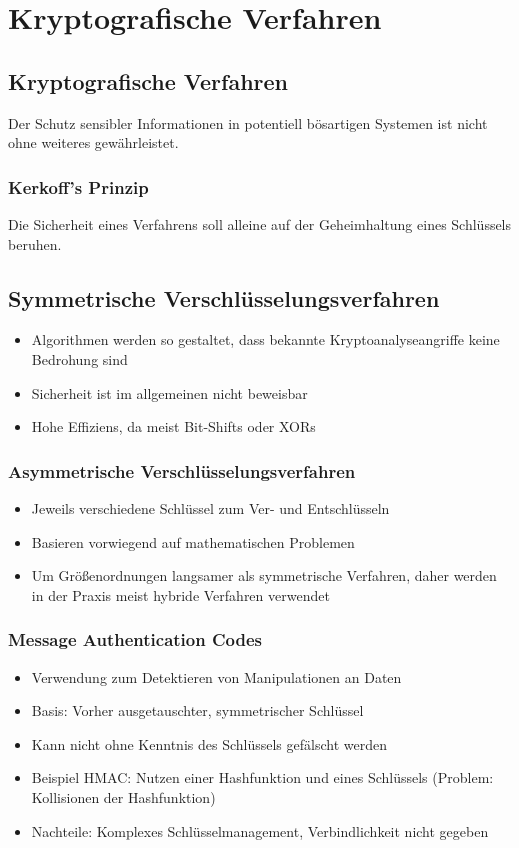 \section{Kryptografische Verfahren}

\subsection{Kryptografische Verfahren}
Der Schutz sensibler Informationen in potentiell bösartigen Systemen ist nicht ohne weiteres gewährleistet.

\subsubsection{Kerkoff's Prinzip}
Die Sicherheit eines Verfahrens soll alleine auf der Geheimhaltung eines Schlüssels beruhen.

\subsection{Symmetrische Verschlüsselungsverfahren}
\begin{itemize}
	\item Algorithmen werden so gestaltet, dass bekannte Kryptoanalyseangriffe keine Bedrohung sind
	\item Sicherheit ist im allgemeinen nicht beweisbar
	\item Hohe Effiziens, da meist Bit-Shifts oder XORs
\end{itemize}

\subsubsection{Asymmetrische Verschlüsselungsverfahren}
\begin{itemize}
	\item Jeweils verschiedene Schlüssel zum Ver- und Entschlüsseln
	\item Basieren vorwiegend auf mathematischen Problemen
	\item Um Größenordnungen langsamer als symmetrische Verfahren, daher werden in der Praxis meist hybride Verfahren verwendet
\end{itemize}

\subsubsection{Message Authentication Codes}
\begin{itemize}
	\item Verwendung zum Detektieren von Manipulationen an Daten
	\item Basis: Vorher ausgetauschter, symmetrischer Schlüssel
	\item Kann nicht ohne Kenntnis des Schlüssels gefälscht werden
	\item Beispiel HMAC: Nutzen einer Hashfunktion und eines Schlüssels (Problem: Kollisionen der Hashfunktion)
	\item Nachteile: Komplexes Schlüsselmanagement, Verbindlichkeit nicht gegeben
\end{itemize}

